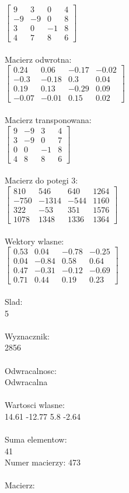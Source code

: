 \documentclass[a4paper,12pt]{article}
\begin{document}
$\begin{bmatrix} 9&3&0&4\\-9&-9&0&8\\3&0&-1&8\\4&7&8&6 \end{bmatrix}$
\\
\\
Macierz odwrotna:\\

$\begin{bmatrix} 0.24&0.06&-0.17&-0.02\\-0.3&-0.18&0.3&0.04\\0.19&0.13&-0.29&0.09\\-0.07&-0.01&0.15&0.02 \end{bmatrix}$
\\
\\
Macierz transponowana:\\

$\begin{bmatrix} 9&-9&3&4\\3&-9&0&7\\0&0&-1&8\\4&8&8&6 \end{bmatrix}$
\\
\\
Macierz do potegi 3:\\

$\begin{bmatrix} 810&546&640&1264\\-750&-1314&-544&1160\\322&-53&351&1576\\1078&1348&1336&1364 \end{bmatrix}$
\\
\\
Wektory wlasne:\\

$\begin{bmatrix} 0.53&0.04&-0.78&-0.25\\0.04&-0.84&0.58&0.64\\0.47&-0.31&-0.12&-0.69\\0.71&0.44&0.19&0.23 \end{bmatrix}$
\\
\\
Slad:\\
5
\\
\\
Wyznacznik:\\
2856
\\
\\
Odwracalnosc:\\
Odwracalna
\\
\\
Wartosci wlasne:\\
14.61 -12.77 5.8 -2.64
\\
\\
Suma elementow:\\
41
\\
\newpage
Numer macierzy:
473
\\
\\
Macierz:\\
\end{document}
